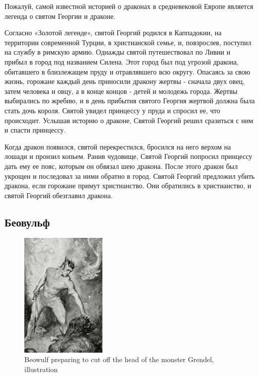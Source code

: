 Пожалуй, самой известной историей о драконах в средневековой Европе
является легенда о святом Георгии и драконе.

Согласно «Золотой легенде», святой Георгий родился в Каппадокии, на
территории современной Турции, в христианской семье, и, повзрослев,
поступил на службу в римскую армию. Однажды святой путешествовал по
Ливии и прибыл в город под названием Силена. Этот город был под
угрозой дракона, обитавшего в близлежащем пруду и отравлявшего всю
округу. Опасаясь за свою жизнь, горожане каждый день приносили
дракону жертвы - сначала двух овец, затем человека и овцу, а в конце
концов - детей и молодежь города. Жертвы выбирались по жребию, и в
день прибытия святого Георгия жертвой должна была стать дочь короля.
Святой увидел принцессу у пруда и спросил ее, что происходит.
Услышав историю о драконе, Святой Георгий решил сразиться с ним и
спасти принцессу.

Когда дракон появился, святой перекрестился, бросился на него верхом
на лошади и пронзил копьем. Ранив чудовище, Святой Георгий попросил
принцессу дать ему ее пояс, которым он обвязал шею дракона. После
этого дракон был укрощен и последовал за ними обратно в город.
Святой Георгий предложил убить дракона, если горожане примут
христианство. Они обратились в христианство, и святой Георгий
обезглавил дракона.

\newpage

\subsection*{Беовульф}

\begin{figure}
    \centering
    \includegraphics[width=0.37\textwidth]{Beowulf-Grendel-head-illustration-British-Race-Legends-1910.jpg}
    \caption{Beowulf preparing to cut off the head of the monster Grendel, illustration}
\end{figure}

